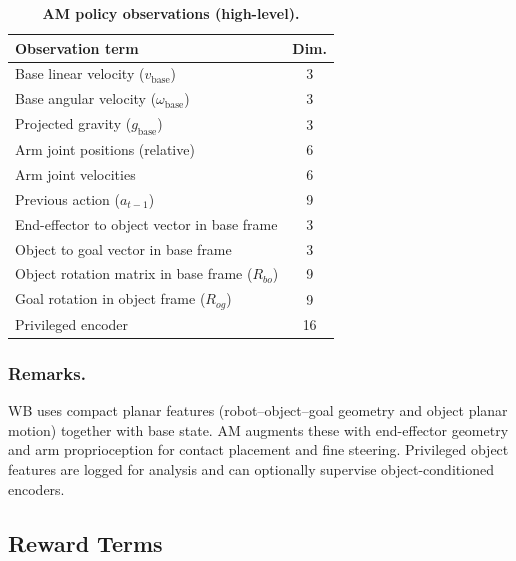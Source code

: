 \begin{table}[t]
\centering
\caption{\textbf{AM policy observations (high-level).}}
\label{tab:obs_am}
\scriptsize
\setlength{\tabcolsep}{3pt}
\renewcommand{\arraystretch}{1.08}
\begin{tabular}{l c}
\toprule
\textbf{Observation term} & \textbf{Dim.}\\
\midrule
Base linear velocity ($v_{\text{base}}$) & 3\\
Base angular velocity ($\omega_{\text{base}}$) & 3\\
Projected gravity ($g_{\text{base}}$) & 3\\
Arm joint positions (relative) & 6\\
Arm joint velocities & 6\\
Previous action ($a_{t-1}$) & 9\\
\addlinespace[0.25em]\hline\addlinespace[0.15em]
End-effector to object vector in base frame & 3\\
Object to goal vector in base frame & 3\\
Object rotation matrix in base frame ($R_{bo}$) & 9\\
Goal rotation in object frame ($R_{og}$) & 9\\
\addlinespace[0.25em]\hline\addlinespace[0.15em]
Privileged encoder & 16\\
\bottomrule
\end{tabular}
\end{table}

\subsubsection{Remarks.}
WB uses compact planar features (robot--object--goal geometry and object planar motion) together with base state.
AM augments these with end-effector geometry and arm proprioception for contact placement and fine steering.
Privileged object features are logged for analysis and can optionally supervise object-conditioned encoders.


\subsection{Reward Terms}
\label{sec:reward_terms}

